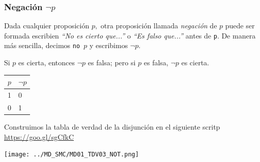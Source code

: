 \documentclass[xcolor={svgnames},
  hyperref={colorlinks}, 
  spanish, 12pt]{beamer}
\numberwithin{equation}{section} %
\numberwithin{figure}{section} %
\begin{document}
\subsubsection{Negaci\'on $\neg p$}

\begin{frame}
 Dada cualquier proposici\'on $p,$ otra proposici\'on llamada \emph{negaci\'on} de $p$ puede ser formada escribien \emph{``No es cierto que...''} o \emph{``Es falso que...''} antes de \texttt{p}.
 \pause
 De manera m\'as sencilla, decimos \texttt{no $p$} y escribimos $\neg p.$
\end{frame}

\begin{frame}
 
\begin{defn}[Negaci\'on]
 Si $p$ es cierta, entonces $\neg p$ es falsa; pero si $p$ es falsa, $\neg p$ es cierta.
\end{defn}

\end{frame}

\begin{frame}
    \begin{tdv}[Negaci\'on]
        \label{tdv:not}
        \begin{center}
            \begin{tabular}{|l|l|}\hline
                $p$ & $\neg p$\\\hline
                1 & 0 \\\hline
                0 & 1 \\\hline
            \end{tabular}
        \end{center}
        
    \end{tdv}
    
\end{frame}

\begin{frame}
    Construimos la tabla de verdad de la disjunci\'on en el siguiente scritp \href{https://cloud.sagemath.com/projects/12787063-cafe-4f3b-a2e0-905f8b83cf3b/files/MD01_TDV03_NOT.sagews}{https://goo.gl/sgCfkC}
    \begin{center}
        \texttt{[image: ../MD\_SMC/MD01\_TDV03\_NOT.png]}
    \end{center}
    
\end{frame}
\end{document}
